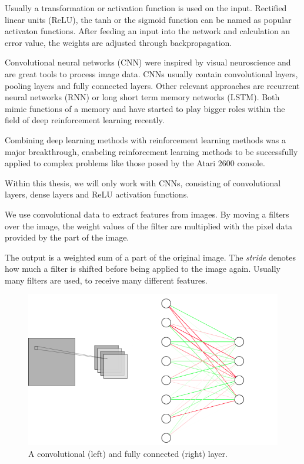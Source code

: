 Usually a transformation or activation function is used on the input. Rectified linear units (ReLU), the tanh or the sigmoid function can be named as popular activaton functions.
After feeding an input into the network and calculation an error value, the weights are adjusted through backpropagation.

Convolutional neural networks (CNN) were inspired by visual neuroscience and are great tools to process image data. CNNs usually contain convolutional layers, pooling layers and fully connected layers.
Other relevant approaches are recurrent neural networks (RNN) or long short term memory networks (LSTM). Both mimic functions of a memory and have started to play bigger roles within the field of deep reinforcement learning recently.

Combining deep learning methods with reinforcement learning methods was a major breakthrough, enabeling reinforcement learning methods to be successfully applied to complex problems like those posed by the Atari 2600 console. \citep{deeprlLi}

Within this thesis, we will only work with CNNs, consisting of convolutional layers, dense layers and ReLU activation functions.

We use convolutional data to extract features from images. By moving a filters over the image, the weight values of the filter are multiplied with the pixel data provided by the part of the image.

The output is a weighted sum of a part of the original image.
The \textit{stride} denotes how much a filter is shifted before being applied to the image again. Usually many filters are used, to receive many different features.

\begin{figure}
\includegraphics[scale=0.5]{bilder/deeplayers.png}
\caption{A convolutional (left) and fully connected (right) layer.
}
\end{figure}

